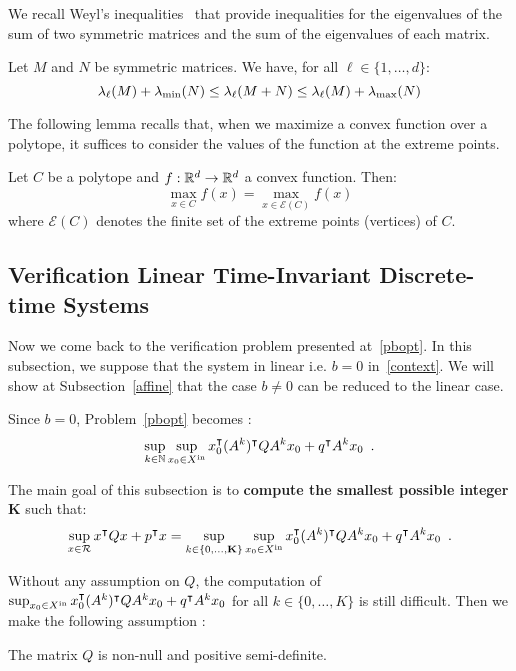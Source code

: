 \documentclass[10pt]{article}
\begin{document}
We recall Weyl's inequalities~\cite{horn1990matrix} that provide inequalities for the eigenvalues of the sum of two symmetric matrices and the sum of the eigenvalues of each matrix.  
\begin{lemma}
\label{le}
Let $M$ and $N$ be symmetric matrices. We have, for all $\ell\in\{1,\ldots,d\}$:
\[
\lambda_\ell(M)+\lambda_{\operatorname{min}}(N)\leq \lambda_\ell(M+N)\leq \lambda_\ell(M)+\lambda_{\operatorname{max}}(N)
\]
\end{lemma}
The following lemma recalls that, when we maximize a convex function over a polytope, it suffices to consider the values of the function at the extreme points. 
\begin{lemma}
\label{lemma2}
Let $C$ be a polytope and $f:\mathbb R^d\to\mathbb R^d$ a convex function. Then:
\[
\max_{x\in C} f(x)=\max_{x\in \mathcal{E}(C)} f(x)
\]
where $\mathcal{E}(C)$ denotes the finite set of the extreme points (vertices) of $C$.
\end{lemma}


\subsection{Verification Linear Time-Invariant Discrete-time Systems}
\label{mainsub}
Now we come back to the verification problem presented at~\eqref{pbopt}. In this subsection, we suppose that the system in linear i.e. $b=0$ in~\eqref{context}. We will show at Subsection~\ref{affine} that the case $b\neq 0$ can be reduced to the linear case.

Since $b=0$, Problem~\eqref{pbopt} becomes :
\[
\sup_{k\in\mathbb{N}}\sup_{x_0\in X^\mathrm{in}} x_0^\intercal (A^k)^\intercal Q A^k x_0+q^\intercal A^k x_0\enspace .
\]

The main goal of this subsection is to {\bf compute the smallest possible integer} $\mathbf K$ such that:
\[
 \sup_{x\in\mathcal{R}} x^\intercal Q x+p^\intercal x=\sup_{k\in\{0,\ldots,\mathbf K\}}\sup_{x_0\in X^\mathrm{in}} x_0^\intercal (A^k)^\intercal Q A^k x_0+q^\intercal A^k x_0\enspace .
\]

Without any assumption on $Q$, the computation of  $\sup_{x_0\in X^\mathrm{in}} x_0^\intercal (A^k)^\intercal Q A^k x_0+q^\intercal A^k x_0$ for all $k\in\{0,\ldots,K\}$ is still difficult. Then we make the following assumption : 
\begin{assumption}
\label{assum1}
The matrix $Q$ is non-null and positive semi-definite.
\end{assumption}
\end{document}
